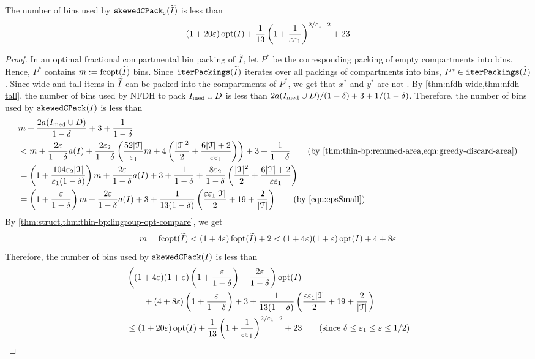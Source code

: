 \begin{theorem}
The number of bins used by $\operatorname{\mathtt{skewedCPack}}_{\varepsilon}(\widetilde{I})$ is less than
\[ (1+20\varepsilon)\operatorname{opt}(I)
    + \frac{1}{13}\left(1 + \frac{1}{\varepsilon\varepsilon_1}\right)^{2/\varepsilon_1 - 2} + 23 \]
\end{theorem}
\begin{proof}
In an optimal fractional compartmental bin packing of $\widetilde{I}$,
let $P^*$ be the corresponding packing of empty compartments into bins.
Hence, $P^*$ contains $m := \operatorname{fcopt}(\widetilde{I})$ bins.
Since $\operatorname{\mathtt{iterPackings}}(\widetilde{I})$ iterates over all packings of compartments into bins,
$P^* \in \operatorname{\mathtt{iterPackings}}(\widetilde{I})$.
Since wide and tall items in $\widetilde{I}$ can be packed into the compartments of $P^*$,
we get that $x^*$ and $y^*$ are not \Null.
By \cref{thm:nfdh-wide,thm:nfdh-tall}, the number of bins used by NFDH to pack
$I_{\mathrm{med}} \cup D$ is less than $2a(I_{\mathrm{med}} \cup D)/(1-\delta) + 3 + 1/(1-\delta)$.
Therefore, the number of bins used by $\operatorname{\mathtt{skewedCPack}}(I)$ is less than
\begin{align*}
& m + \frac{2a(\Imed \cup D)}{1-\delta} + 3 + \frac{1}{1-\delta}
\\ &< m + \frac{2\eps}{1-\delta}a(I)
    + \frac{2\epsSmall}{1-\delta}\left(\frac{52|\Tcal|}{\epsLarge} m
        + 4\left(\frac{|\Tcal|^2}{2} + \frac{6|\Tcal|+2}{\eps\epsLarge}\right)\right)
    + 3 + \frac{1}{1-\delta}
    \tag{by \cref{thm:thin-bp:remmed-area,eqn:greedy-discard-area}}
\\ &= \left(1 + \frac{104\epsSmall|\Tcal|}{\epsLarge(1-\delta)}\right)m
    + \frac{2\eps}{1-\delta}a(I)
    + 3 + \frac{1}{1-\delta} + \frac{8\epsSmall}{1-\delta}\left(
        \frac{|\Tcal|^2}{2} + \frac{6|\Tcal|+2}{\eps\epsLarge}\right)
\\ &= \left(1 + \frac{\eps}{1-\delta}\right)m + \frac{2\eps}{1-\delta}a(I)
    + 3 + \frac{1}{13(1-\delta)}\left(\frac{\eps\epsLarge|\Tcal|}{2}
        + 19 + \frac{2}{|\Tcal|}\right)
    \tag{by \cref{eqn:epsSmall}}
\end{align*}
By \cref{thm:struct,thm:thin-bp:lingroup-opt-compare}, we get
\[ m = \operatorname{fcopt}(\widetilde{I}) < (1+4\varepsilon)\operatorname{fopt}(\widetilde{I}) + 2
< (1+4\varepsilon)(1+\varepsilon)\operatorname{opt}(I) + 4 + 8\varepsilon \]
Therefore, the number of bins used by $\operatorname{\mathtt{skewedCPack}}(I)$ is less than
\begin{align*}
& \left((1+4\eps)(1+\eps)\left(1 + \frac{\eps}{1-\delta}\right)
    + \frac{2\eps}{1-\delta}\right)\opt(I)
\\ &\qquad + (4 + 8\eps)\left(1 + \frac{\eps}{1-\delta}\right) + 3
    + \frac{1}{13(1-\delta)}\left(\frac{\eps\epsLarge|\Tcal|}{2} + 19 + \frac{2}{|\Tcal|}\right)
\\ &\le (1+20\eps)\opt(I)
    + \frac{1}{13}\left(1 + \frac{1}{\eps\epsLarge}\right)^{2/\epsLarge - 2} + 23
    \tag{since $\delta \le \epsLarge \le \eps \le 1/2$}
\end{align*}
\end{proof}
